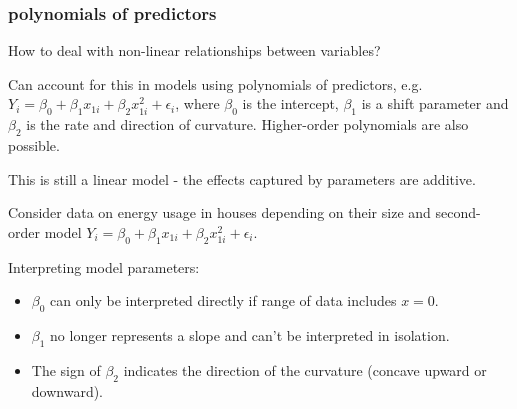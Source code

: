 \subsubsection{polynomials of predictors}

How to deal with non-linear relationships between variables?

Can account for this in models using polynomials of predictors, e.g. $Y_i = \beta_0 + \beta_1x_{1i} + \beta_2x_{1i}^2 + \epsilon_i$, where $\beta_0$ is the intercept, $\beta_1$ is a shift parameter and $\beta_2$ is the rate and direction of curvature. Higher-order polynomials are also possible.

This is still a linear model - the effects captured by parameters are additive.

\begin{example}
	Consider data on energy usage in houses depending on their size and second-order model $Y_i = \beta_0 + \beta_1x_{1i} + \beta_2x_{1i}^2 + \epsilon_i$.
	\begin{center}
	\end{center}
\end{example}

Interpreting model parameters:
\begin{itemize}
	\item $\beta_0$ can only be interpreted directly if range of data includes $x=0$.
	\item $\beta_1$ no longer represents a slope and can't be interpreted in isolation.
	\item The sign of $\beta_2$ indicates the direction of the curvature (concave upward or downward).
\end{itemize}

